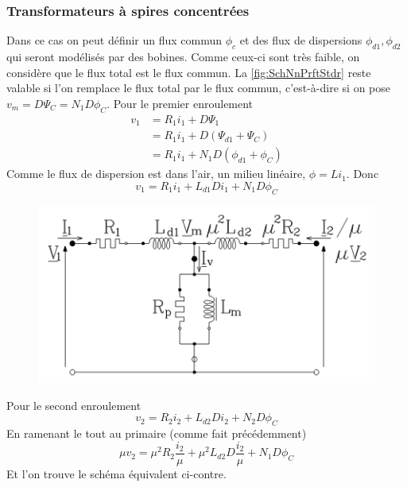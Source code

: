 		\subsubsection{Transformateurs à spires concentrées}
		Dans ce cas on peut définir un flux commun $\phi_c$ et des flux de 
		dispersions $\phi_{d1},\phi_{d2}$ qui seront modélisés par des bobines. 
		Comme ceux-ci sont très faible, on 
		considère que le flux total est le flux commun. La \autoref{fig:SchNnPrftStdr}
		reste valable si l'on remplace le flux total par le flux commun, c'est-à-dire 
		si on pose $v_m = D\Psi_C=N_1D\phi_C$.
		Pour le premier enroulement
		\begin{equation}
		\begin{array}{ll}
		v_1 &= R_1i_1 + D\Psi_1\\
		&= R_1i_1 + D(\Psi_{d1}+\Psi_C)\\
		&= R_1i_1 + N_1D(\phi_{d1}+\phi_C)
		\end{array}
		\end{equation}
		Comme le flux de dispersion est dans l'air, un milieu linéaire, $\phi = Li_1$. 
		Donc
		\begin{equation}
		v_1 = R_1i_1 + L_{d1}Di_1+N_1D\phi_C
		\end{equation}
		\begin{figure}
		\includegraphics[scale=0.5]{ch3/imager3.png}
		\end{figure}				
		Pour le second enroulement	
		\begin{equation}
		v_2 = R_2i_2 + L_{d2}Di_2+N_2D\phi_C
		\end{equation}	
		En ramenant le tout au primaire (comme fait précédemment)
		\begin{equation}
		\mu v_2 = \mu^2R_2\dfrac{i_2}{\mu}+\mu^2L_{d2}D\dfrac{i_2}{\mu}+N_1D\phi_C
		\end{equation}
		Et l'on trouve le schéma équivalent ci-contre.\\
		
